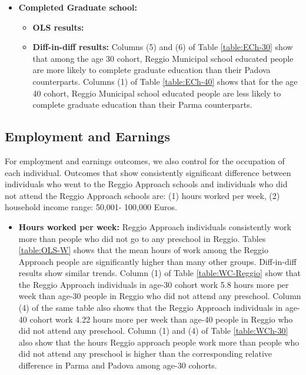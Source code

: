 \documentclass[11pt]{article}
\begin{document}
\begin{itemize}
\item \textbf{Completed Graduate school:} 
	\begin{itemize}
	\item \textbf{OLS results:} %
	\item \textbf{Diff-in-diff results:}  Columns (5) and (6) of Table \ref{table:ECh-30} show that among the age 30 cohort, Reggio Municipal school educated people are more likely to complete graduate education than their Padova counterparts.  Columns (1) of Table \ref{table:ECh-40} shows that for the age 40 cohort,  Reggio Municipal school educated people are less  likely to complete graduate education than their Parma counterparts.
\end{itemize}

\end{itemize}

\subsection{Employment and Earnings}
For employment and earnings outcomes, we also control for the occupation of each individual. Outcomes that show consistently significant difference between individuals who went to the Reggio Approach schools and individuals who did not attend the Reggio Approach schools are: (1) hours worked per week, (2) household income range: 50,001- 100,000 Euros.

\begin{itemize}
\item \textbf{Hours worked per week:} Reggio Approach individuals consistently work more than people who did not go to any preschool in Reggio. Tables \ref{table:OLS-W} shows that the mean hours of work among the Reggio Approach people are significantly higher than many other groups. Diff-in-diff results show similar trends. Column (1) of Table \ref{table:WC-Reggio} show that the Reggio Approach individuals in age-30 cohort work 5.8 hours more per week than age-30 people in Reggio who did not attend any preschool. Column (4) of the same table also shows that the Reggio Approach individuals in age-40 cohort work 4.22 hours more per week than age-40 people in Reggio who did not attend any preschool. Column (1) and (4) of Table \ref{table:WCh-30} also show that the hours Reggio approach people work more than people who did not attend any preschool is higher than the corresponding relative difference in Parma and Padova among age-30 cohorts.  
\end{itemize}  
\end{document}
